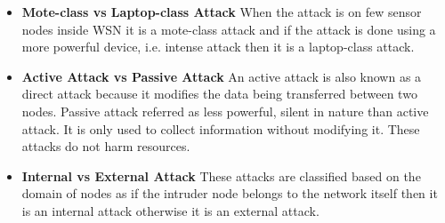 \begin{itemize}
  \item{ \textbf{Mote-class vs Laptop-class Attack}  When the attack is on few sensor nodes inside WSN it is a mote-class attack and if the attack is done using a more powerful device, i.e. intense attack then it is a laptop-class attack.} 
  \item{ \textbf{Active Attack vs Passive Attack} An active attack is also known as a direct attack because it modifies the data being transferred between two nodes. Passive attack referred as less powerful, silent in nature than active attack. It is only used to collect information without modifying it. These attacks do not harm resources.}
  \item{ \textbf{Internal vs External Attack} These attacks are classified based on the domain of nodes as if the intruder node belongs to the network itself then it is an internal attack otherwise it is an external attack.}
\end{itemize}

\noindent

